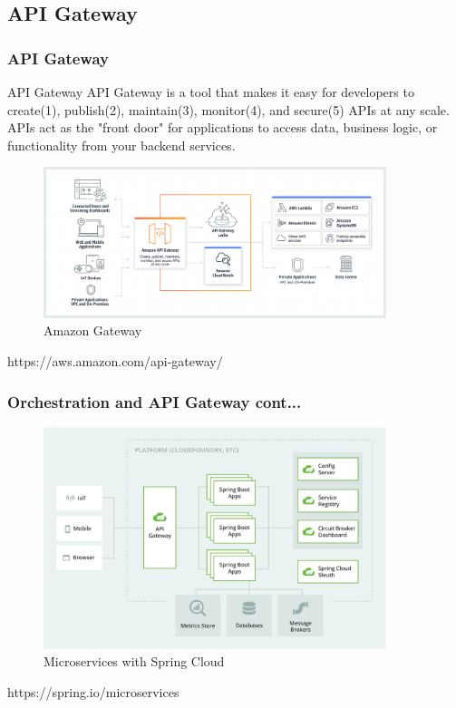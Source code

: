 \documentclass{beamer}
\begin{document}
	\subsection {API Gateway}
		\begin{frame}
		\frametitle{API Gateway}
			\begin{block} {API Gateway}
				\scriptsize {API Gateway is a tool that makes it easy for developers to create(1), publish(2), maintain(3), monitor(4), and secure(5) APIs at any scale. APIs act as the "front door" for applications to access data, business logic, or functionality from your backend services}.
			\end{block}
			\begin{figure}[h]
				\includegraphics[width=100mm, scale=1]{img/amazon-gateway.png}
				\caption{Amazon Gateway}
			\end{figure}\vspace{1mm}
		
			\tiny{https://aws.amazon.com/api-gateway/}	
		\end{frame}
	
		\begin{frame}
			\frametitle{Orchestration and API Gateway cont...}
				\begin{figure}[h]
					\includegraphics[width=100mm, scale=2]{img/microservice-diagrame.png}
					\caption{Microservices with Spring Cloud}
				\end{figure}\vspace{20mm}
				
				\tiny{https://spring.io/microservices}	
		\end{frame}
	
\end{document}
